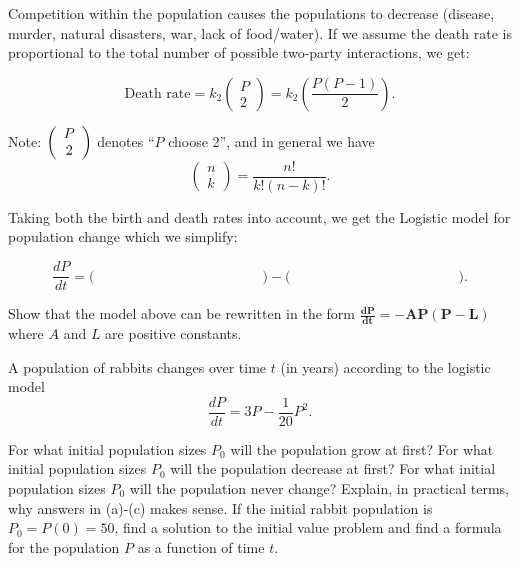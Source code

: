 \begin{enumerate}
\bs

Competition within the population causes the populations to decrease (disease, murder, natural disasters, war, lack of food/water). If we assume the \alert{death rate is proportional to the total number of possible two-party interactions}, we get:

\[ \mbox{Death rate} = k_2 \left( \begin{array}{c} P\\ 2 \end{array} \right) = k_2 \left( \frac{P(P-1)}{2} \right) .\]

Note: $\displaystyle \left( \begin{array}{c} P\\ 2 \end{array} \right)$ denotes ``$P$ choose 2'', and in general we have
\[ \left( \begin{array}{c} n\\ k \end{array} \right) = \frac{n!}{k!(n-k)!}.\]
\ebox

\bs 

Taking both the birth and death rates into account, we get the \alert{Logistic model} for population change which we simplify:

\[ \frac{dP}{dt} = \bigg( \hspace{2in}  \bigg) - \bigg( \hspace{2in} \bigg) .\]  \bs

\bb[resume]
\ii Show that the model above can be rewritten in the form $\mathbf{\frac{dP}{dt} = -AP(P-L)}$ where $A$ and $L$ are positive constants.
\ee

\clearpage
{}

\bb[resume]
\ii A population of rabbits changes over time $t$ (in years) according to the logistic model
\[ \frac{dP}{dt} = 3P-\frac{1}{20}P^2 .\]

\bb
\ii For what initial population sizes $P_0$ will the population grow at first? \vspace{0.5in}
\ii For what initial population sizes $P_0$ will the population decrease at first? \vspace{0.5in}
\ii For what initial population sizes $P_0$ will the population never change? \vspace{0.5in}
\ii Explain, in practical terms, why answers in (a)-(c) makes sense. \vspace{1in}
\ii If the initial rabbit population is $P_0=P(0)=50$, find a solution to the 
initial value problem and find a formula for the population $P$ as a function of time $t$.
\ee
\ee


\end{enumerate}

